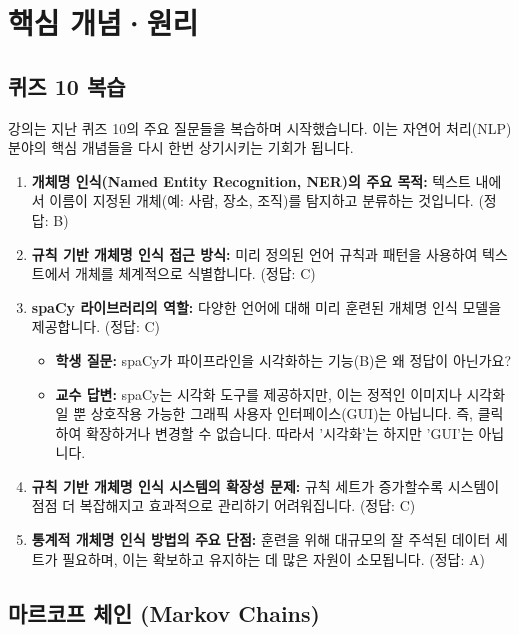 \documentclass[11pt,a4paper]{article}
\theoremstyle{definition}
\begin{document}
\newpage
\section{핵심 개념·원리}

\subsection{퀴즈 10 복습}

강의는 지난 퀴즈 10의 주요 질문들을 복습하며 시작했습니다. 이는 자연어 처리(NLP) 분야의 핵심 개념들을 다시 한번 상기시키는 기회가 됩니다.

\begin{tcolorbox}[conceptbox, title=퀴즈 10 주요 내용]
\begin{enumerate}
    \item \textbf{개체명 인식(Named Entity Recognition, NER)의 주요 목적:} 텍스트 내에서 이름이 지정된 개체(예: 사람, 장소, 조직)를 탐지하고 분류하는 것입니다. (정답: B)
    \item \textbf{규칙 기반 개체명 인식 접근 방식:} 미리 정의된 언어 규칙과 패턴을 사용하여 텍스트에서 개체를 체계적으로 식별합니다. (정답: C)
    \item \textbf{spaCy 라이브러리의 역할:} 다양한 언어에 대해 미리 훈련된 개체명 인식 모델을 제공합니다. (정답: C)
    \begin{itemize}
        \item \textbf{학생 질문:} spaCy가 파이프라인을 시각화하는 기능(B)은 왜 정답이 아닌가요?
        \item \textbf{교수 답변:} spaCy는 시각화 도구를 제공하지만, 이는 정적인 이미지나 시각화일 뿐 상호작용 가능한 그래픽 사용자 인터페이스(GUI)는 아닙니다. 즉, 클릭하여 확장하거나 변경할 수 없습니다. 따라서 '시각화'는 하지만 'GUI'는 아닙니다.
    \end{itemize}
    \item \textbf{규칙 기반 개체명 인식 시스템의 확장성 문제:} 규칙 세트가 증가할수록 시스템이 점점 더 복잡해지고 효과적으로 관리하기 어려워집니다. (정답: C)
    \item \textbf{통계적 개체명 인식 방법의 주요 단점:} 훈련을 위해 대규모의 잘 주석된 데이터 세트가 필요하며, 이는 확보하고 유지하는 데 많은 자원이 소모됩니다. (정답: A)
\end{enumerate}
\end{tcolorbox}

\subsection{마르코프 체인 (Markov Chains)}
\end{document}
